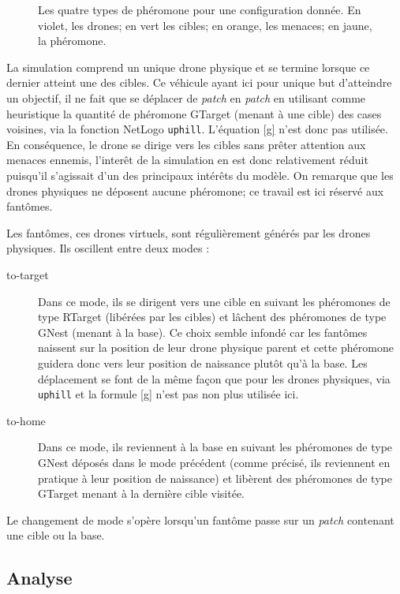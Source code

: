 \documentclass[12pt]{article}
\begin{document}
\begin{figure}[p]
  \caption{Les quatre types de phéromone pour une configuration
    donnée. En violet, les drones; en vert les cibles; en orange, les
    menaces; en jaune, la phéromone.}
  \label{pheromones}
\end{figure}

La simulation comprend un unique drone physique et se termine lorsque ce
dernier atteint une des cibles. Ce véhicule ayant ici pour unique but
d'atteindre un objectif, il ne fait que se déplacer de \textit{patch}
en \textit{patch} en utilisant comme heuristique la quantité de
phéromone GTarget (menant à une cible) des cases voisines, via la fonction
NetLogo \texttt{uphill}. L'équation
\ref{g} n'est donc pas utilisée. En conséquence, le drone se dirige vers
les cibles sans prêter attention aux menaces ennemis, l'interêt de la simulation en est donc 
relativement réduit puisqu'il s'agissait d'un des principaux intérêts du modèle. 
On remarque que les drones physiques ne déposent aucune
phéromone; ce travail est ici réservé aux fantômes.

Les fantômes, ces drones virtuels, sont régulièrement générés par les drones 
physiques. Ils oscillent entre deux modes :

\begin{description}
  
  \item[to-target]{Dans ce mode, ils se dirigent vers une cible en suivant les phéromones
  de type RTarget (libérées par les cibles) et lâchent des 
  phéromones de type GNest (menant à la base). Ce choix semble infondé car les fantômes naissent
  sur la position de leur drone physique parent et cette phéromone guidera donc vers leur
  position de naissance plutôt qu'à la base. Les déplacement se font de la même façon que pour les drones
  physiques, via \texttt{uphill} et la formule \ref{g} n'est pas non plus utilisée ici.}

  \item[to-home]{Dans ce mode, ils reviennent à la base en suivant les phéromones de type
  GNest déposés dans le mode précédent (comme précisé, ils reviennent en pratique à leur position
  de naissance) et libèrent des phéromones de type GTarget menant à la dernière cible visitée.}

\end{description}

Le changement de mode s'opère lorsqu'un fantôme passe sur un \textit{patch} contenant une cible ou la base.

\subsection{Analyse}
\end{document}
